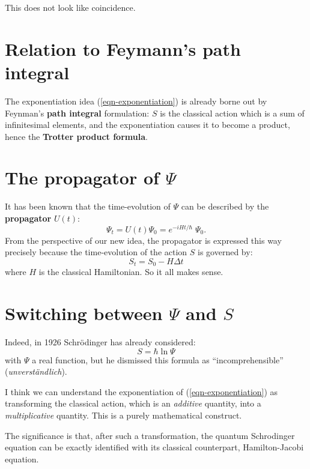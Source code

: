 This does not look like coincidence.

\section{Relation to Feymann's path integral}

The exponentiation idea (\ref{eqn-exponentiation}) is already borne out by Feynman's \textbf{path integral} formulation:  $S$ is the classical action which is a sum of infinitesimal elements, and the exponentiation causes it to become a product, hence the \textbf{Trotter product formula}.

\section{The propagator of $\Psi$}

It has been known that the time-evolution of $\Psi$ can be described by the \textbf{propagator} $U(t)$:
\begin{equation}
\Psi_t = U(t) \Psi_0 = e^{-i H t / \hbar} \; \Psi_0 .
\end{equation}
From the perspective of our new idea, the propagator is expressed this way precisely because the time-evolution of the action $S$ is governed by:
\begin{equation}
S_t = S_0 - H \Delta t
\end{equation}
where $H$ is the classical Hamiltonian.  So it all makes sense.

\section{Switching between $\Psi$ and $S$}

Indeed, in 1926 Schr\"odinger \parencite{Schrodinger1926} has already considered:
\begin{equation}
S = \hbar \ln \Psi
\end{equation}
with $\Psi$ a real function, but he dismissed this formula as ``incomprehensible'' (\textit{unverst\"andlich}).

I think we can understand the exponentiation of (\ref{eqn-exponentiation}) as transforming the classical action, which is an \textit{additive} quantity, into a \textit{multiplicative} quantity.  This is a purely mathematical construct.

The significance is that, after such a transformation, the quantum Schrodinger equation can be exactly identified with its classical counterpart, Hamilton-Jacobi equation.

